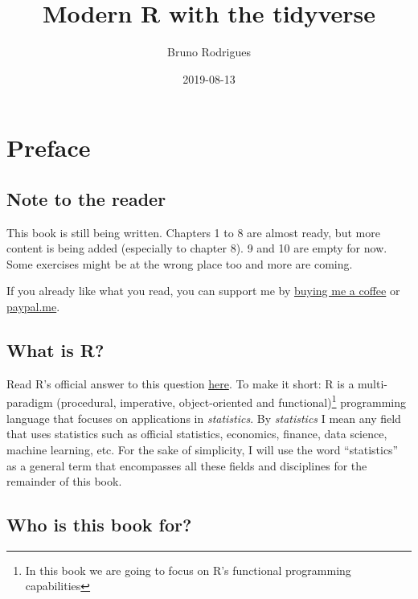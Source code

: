 \documentclass[]{gitbook}
\title{Modern R with the tidyverse}
\author{Bruno Rodrigues}
\date{2019-08-13}
\let\rmarkdownfootnote\footnote%
\def\footnote{\protect\rmarkdownfootnote}
\begin{document}
\maketitle

{
\setcounter{tocdepth}{2}
\tableofcontents
}
\hypertarget{preface}{%
\section*{Preface}\label{preface}}

\hypertarget{note-to-the-reader}{%
\subsection*{Note to the reader}\label{note-to-the-reader}}

This book is still being written. Chapters 1 to 8 are almost ready, but more content is being added
(especially to chapter 8). 9 and 10 are empty for now. Some exercises might be at the wrong place
too and more are coming.

If you already like what you read, you can support
me by \href{https://www.buymeacoffee.com/brodriguesco}{buying me a coffee}
or \href{https://www.paypal.me/brodriguesco}{paypal.me}.

\hypertarget{what-is-r}{%
\subsection*{What is R?}\label{what-is-r}}

Read R's official answer to this question
\href{https://cran.r-project.org/doc/FAQ/R-FAQ.html\#What-is-R_003f}{here}. To make it short: R is a
multi-paradigm (procedural, imperative, object-oriented and functional)\footnote{In this book we are going
  to focus on R's functional programming capabilities} programming language that
focuses on applications in \emph{statistics}. By \emph{statistics} I mean any field that uses statistics such
as official statistics, economics, finance, data science, machine learning, etc. For the sake of
simplicity, I will use the word ``statistics'' as a general term that encompasses all these fields and
disciplines for the remainder of this book.

\hypertarget{who-is-this-book-for}{%
\subsection*{Who is this book for?}\label{who-is-this-book-for}}
\end{document}
